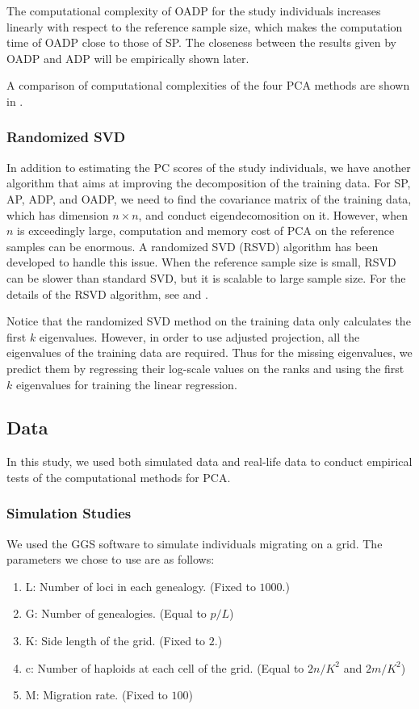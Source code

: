 \documentclass{article}
\begin{document}
The computational complexity of OADP for the study individuals increases linearly with respect to the reference sample size, which makes the computation time of OADP close to those of SP.
The closeness between the results given by OADP and ADP will be empirically shown later.

A comparison of computational complexities of the four PCA methods are shown in .

\subsubsection{Randomized SVD}

In addition to estimating the PC scores of the study individuals,
we have another algorithm that aims at improving the decomposition of the
training data.
For SP, AP, ADP, and OADP, we need to find the covariance matrix of the training
data, which has dimension $n \times n$, and conduct eigendecomosition on it.
However, when $n$ is exceedingly large,
computation and memory cost of PCA on the reference samples can be enormous.
A randomized SVD (RSVD) algorithm has been developed to handle this issue.
When the reference sample size is small, RSVD can be slower than standard SVD,
but it is scalable to large sample size.
For the details of the RSVD algorithm, see \cite{halko} and \cite{abraham}.

Notice that the randomized SVD method on the training data
only calculates the first $k$ eigenvalues.
However, in order to use adjusted projection,
all the eigenvalues of the training data are required.
Thus for the missing eigenvalues,
we predict them by regressing their log-scale values on the ranks
and using the first $k$ eigenvalues for training the linear regression.


\subsection{Data}

In this study, we used both simulated data and real-life data to conduct
empirical tests of the computational methods for PCA.

\subsubsection{Simulation Studies}

We used the GGS software to simulate individuals migrating on a grid.
The parameters we chose to use are as follows:
\begin{enumerate}
\item L: Number of loci in each genealogy. (Fixed to $1000$.)
\item G: Number of genealogies. (Equal to $p / L$)
\item K: Side length of the grid. (Fixed to $2$.)
\item c: Number of haploids at each cell of the grid. (Equal to $2n / K^2$ and
$2m / K^2$)
\item M: Migration rate. (Fixed to $100$)
\end{enumerate}
\end{document}

